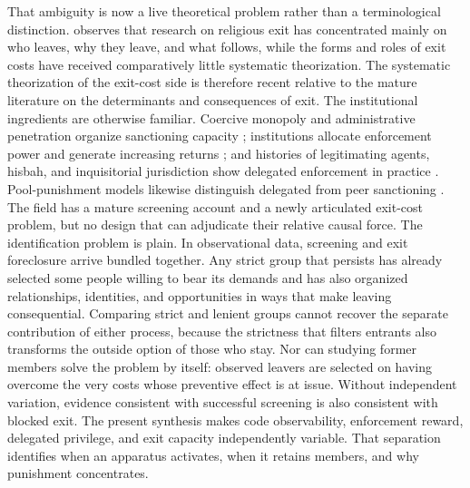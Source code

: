 \documentclass[12pt]{article}
\begin{document}
That ambiguity is now a live theoretical problem rather than a terminological distinction. \citet{bok2025} observes that research on religious exit has concentrated mainly on who leaves, why they leave, and what follows, while the forms and roles of exit costs have received comparatively little systematic theorization. The systematic theorization of the exit-cost side is therefore recent relative to the mature literature on the determinants and consequences of exit. The institutional ingredients are otherwise familiar. Coercive monopoly and administrative penetration organize sanctioning capacity \citep{weber1946,tilly1985,mann1986}; institutions allocate enforcement power and generate increasing returns \citep{north1990,greif2006,greif2016,pierson2000}; and histories of legitimating agents, hisbah, and inquisitorial jurisdiction show delegated enforcement in practice \citep{rubin2017,cook2000,given1997,kelly1989}. Pool-punishment models likewise distinguish delegated from peer sanctioning \citep{hilbe2014,sigmund2010}. The field has a mature screening account and a newly articulated exit-cost problem, but no design that can adjudicate their relative causal force. The identification problem is plain. In observational data, screening and exit foreclosure arrive bundled together. Any strict group that persists has already selected some people willing to bear its demands and has also organized relationships, identities, and opportunities in ways that make leaving consequential. Comparing strict and lenient groups cannot recover the separate contribution of either process, because the strictness that filters entrants also transforms the outside option of those who stay. Nor can studying former members solve the problem by itself: observed leavers are selected on having overcome the very costs whose preventive effect is at issue. Without independent variation, evidence consistent with successful screening is also consistent with blocked exit. The present synthesis makes code observability, enforcement reward, delegated privilege, and exit capacity independently variable. That separation identifies when an apparatus activates, when it retains members, and why punishment concentrates.
\end{document}
